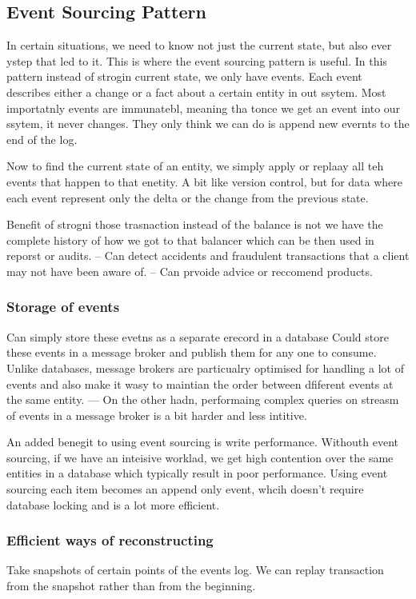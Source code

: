 \documentclass[a4paper, 11pt]{book}
\begin{document}
    \subsection{Event Sourcing Pattern}
    In certain situations, we need to know not just the current state, but also ever ystep that led to it.
    This is where the event sourcing pattern is useful.
    In this pattern instead of strogin current state, we only have events.
    Each event describes either a change or a fact about a certain entity in out ssytem.
    Most importatnly events are immunatebl, meaning tha tonce we get an event into our ssytem, it never changes.
    They only think we can do is append new evernts to the end of the log.

    Now to find the current state of an entity, we simply apply or replaay all teh events that happen to that enetity.
    A bit like version control, but for data where each event represent only the delta or the change from the previous state.

    Benefit of strogni those trasnaction instead of the balance is not we have the complete history of how we got to that balancer which can be then used in reporst or audits.
    -- Can detect accidents and fraudulent transactions that a client may not have been aware of.
    -- Can prvoide advice or reccomend products.

    \subsubsection{Storage of events}
    Can simply store these evetns as a separate erecord in a database
    Could store these events in a message broker and publish them for any one to consume. Unlike databases,  message brokers are particualry optimised for handling a lot of events and also make it wasy to maintian the order between dfiferent events at the same entity.
    --- On the other hadn, performaing complex queries on streasm of events in a message broker is a bit harder and less intitive.

    An added benegit to using event sourcing is write performance.
    Withouth event sourcing, if we have an inteisive worklad, we get high contention over the same entities in a database which typically result in poor performance.
    Using event sourcing each item becomes an append only event, whcih doesn't require database locking and is a lot more efficient.

    \subsubsection{Efficient ways of reconstructing}
    Take snapshots of certain points of the events log.
    We can replay transaction from the snapshot rather than from the beginning.
\end{document}

